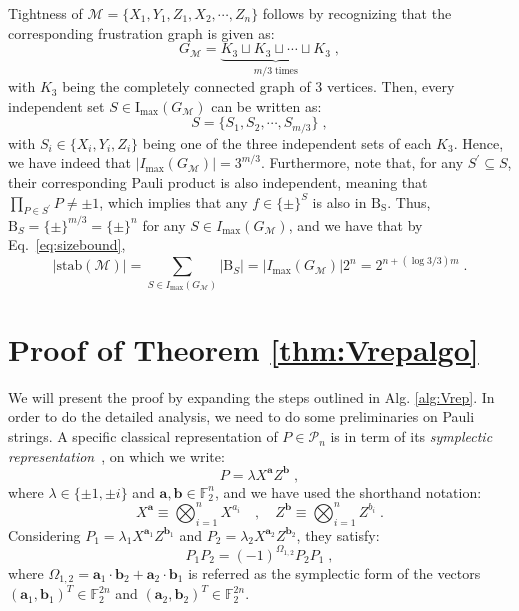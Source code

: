 \documentclass[10pt,aps,pra,twocolumn,floatfix,nofootinbib,superscriptaddress,longbibliography]{revtex4-2}
\newcommand{\1}{\mathbbm{1}}
\begin{document}
Tightness of $\mathcal M = \{X_1,Y_1, Z_1, X_2, \cdots, Z_n\}$ follows by recognizing that the corresponding frustration graph is given as:
\begin{equation}
    G_\mathcal M =\underbrace{K_3 \sqcup K_3 \sqcup \cdots \sqcup K_3}_{m/3\mathrm{\;times}}\;,
\end{equation}
with $K_3$ being the completely connected graph of 3 vertices. Then, every independent set $S \in \mathrm{I}_\mathrm{max}(G_\mathcal M)$ can be written as: 
\begin{equation}
    S = \{S_1, S_2,\cdots, S_{m/3}\}\;,
\end{equation}
with $S_i \in \{X_i,Y_i, Z_i\}$ being one of the three independent sets of each $K_3$. Hence, we have indeed that $|I_\mathrm{max}(G_\mathcal M)|=3^{m/3}$. Furthermore, note that, for any $S^\prime \subseteq S$, their corresponding Pauli product is also independent, meaning that $\prod_{P \in S^\prime}P \neq \pm 1$, which implies that any $f \in \{\pm\}^{S}$ is also in $\mathrm B_\mathrm S$. Thus, $\mathrm B_S =\{\pm\}^{m/3}=\{\pm\}^{n}$ for any $S \in I_\mathrm{max}(G_\mathcal M)$, and we have that by Eq.~\eqref{eq:sizebound},
\begin{equation}
    |\mathrm{stab}(\mathcal M)| =\sum_{S \in I_\mathrm{max}(G_\mathcal M)}|\mathrm B_S| =|I_\mathrm{max}(G_\mathcal M)| 2^{n} = 2^{n+(\log 3/3)m}\;.
\end{equation}


\section{Proof of Theorem \ref{thm:Vrepalgo} \label{proof:Vrepalgo}}
We will present the proof by expanding the steps outlined in Alg. \ref{alg:Vrep}. In order to do the detailed analysis, we need to do some preliminaries on Pauli strings. A specific classical  representation of $P \in \mathcal P_n$ is in term of its \emph{symplectic representation}~\cite{gottesman1997stabilizer, gottesman1998heisenberg}, on which we write:
\begin{equation}
    P = \lambda X^\mathbf a Z^\mathbf b\;,
\end{equation}
where $\lambda \in \{\pm 1, \pm i\}$ and $\mathbf a, \mathbf b \in \mathbb F_2^n$, and we have used the shorthand notation:
\begin{equation}
X^\mathbf a\equiv \bigotimes_{i=1}^n X^{a_i} \quad, \quad Z^\mathbf b  \equiv \bigotimes_{i=1}^n Z^{b_i}\;.
\end{equation}
Considering $P_1 =\lambda_1 X^{\mathbf a_1} Z^{\mathbf b_1}$ and $P_2 =\lambda_2 X^{\mathbf a_2}Z^{\mathbf b_2}$, they satisfy:
\begin{equation}
    P_1 P_2 = (-1)^{\Omega_{1,2}} P_2 P_1\;,
\end{equation}
where $\Omega_{1,2}  = \mathbf a_1 \cdot \mathbf b_2+ \mathbf a_2 \cdot \mathbf b_1$ is referred as the symplectic form of the vectors $(\mathbf a_1,\mathbf b_1)^T \in \mathbb F_2^{2n}$ and $(\mathbf a_2,\mathbf b_2)^T \in \mathbb F_2^{2n}$.
\end{document}
